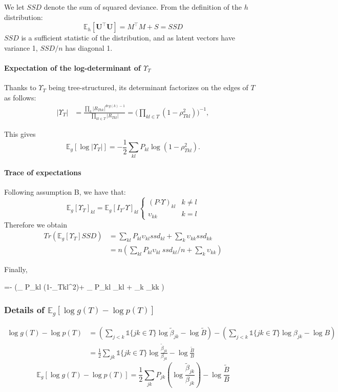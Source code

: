 \documentclass[11pt,a4paper]{article}
\newcommand*\lesswidefbox[1]{\fbox{\hspace{2em}#1\hspace{2em}}}
\newcommand{\Ubf}{\boldsymbol{U}}
\newcommand{\Esp}{\mathds{E}}
\newcommand{\had}{\boldsymbol{\cdot}}
\begin{document}
 We let $SSD$ denote the sum of squared deviance. From the definition of the $h$ distribution: $$ \Esp_h[\Ubf^\intercal \Ubf] = M^\intercal M + S = SSD$$
  $SSD$ is a sufficient statistic of the distribution, and  as latent vectors have variance 1, $SSD/n$ has diagonal 1.
 
\paragraph{Expectation of the log-determinant of $\Upsilon_T$\\}
Thanks to $\Upsilon_T$ being tree-structured, its determinant factorizes on the edges of $T$ as follows:
\begin{align*}
|\Upsilon_T| &=\frac{\prod_k |R_{Tkk}|^{deg(k)-1}}{\prod_{kl \in T} |R_{Tkl}|} =  \Big(\prod_{kl \in T} (1-\rho_{Tkl}^2)\Big)^{-1},
 \end{align*}

 This gives $$ \Esp_g[\log|\Upsilon_T|]=-\frac{1}{2}\sum_{kl} P_{kl}\log(1-\rho_{Tkl}^2).$$
\paragraph{Trace of expectations\\}
Following assumption B, we have that:
  \[ \Esp_g[\Upsilon_T]_{kl}  =  \Esp_g[I_T\had\Upsilon]_{kl} \left\{ 
\begin{array}{cc}
(P \had \Upsilon)_{kl} & k \neq l\\
\upsilon_{kk} & k = l
\end{array}
\right.
\]
Therefore we obtain 
\begin{align*}
Tr(\Esp_g[\Upsilon_T] SSD) &= \sum_{kl} P_{kl} \upsilon_{kl} ssd_{kl} + \sum_k \upsilon_{kk} ssd_{kk}\\
&=n( \sum_{kl} P_{kl} \upsilon_{kl} \:ssd_{kl}/n + \sum_k \upsilon_{kk} )
\end{align*}

Finally, 
\begin{empheq}[box=\lesswidefbox]{align*}
\Esp_{gh} [\log p(\Ubf \mid T)] =- \Big(\sum _{} P_{kl} \log (1-\rho_{Tkl}^2)+ \sum_{} P_{kl} \upsilon_{kl}  + \sum_{k} \upsilon_{kk} \Big)
 \end{empheq}
\subsubsection{Details of $\Esp_g[\log g(T) - \log p(T)]$}
\begin{align*}
\log g(T) - \log p(T) &= \left(  \sum_{j<k} \mathds{1}\{jk \in T\} \log \widetilde{\beta}_{jk} - \log \widetilde{B}\right) - \left(  \sum_{j<k} \mathds{1}\{jk \in T\} \log {\beta}_{jk} - \log {B}\right)\\
&=\frac{1}{2}\sum_{jk} \mathds{1}\{jk \in T\} \log \frac{\widetilde{\beta}_{jk}}{{\beta}_{jk}} - \log \frac{\widetilde{B}}{B}
\end{align*}
$$\boxed{
\Esp_g[\log g(T) - \log p(T)] = \frac{1}{2}\sum_{jk}P_{jk} \left(\log \frac{\widetilde{\beta}_{jk}}{{\beta}_{jk}}\right) - \log \frac{\widetilde{B}}{B} }$$
\end{document}
